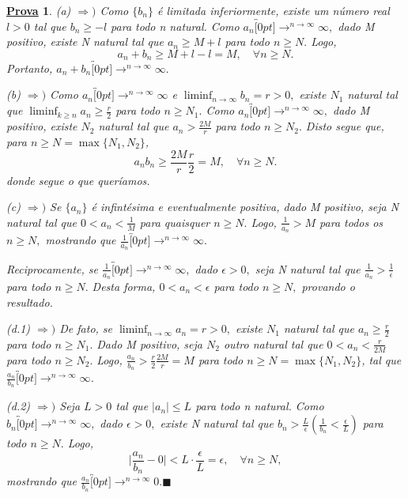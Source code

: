 \documentclass{article}
\newtheorem*{proof*}{\underline{Prova}}
\renewcommand\qedsymbol{$\blacksquare$}
\begin{document}
\begin{proof*}
  (a) $\Rightarrow)$ Como $\{b_{n}\}$ \'e limitada inferiormente, existe um n\'umero real $l > 0$ tal que $b_{n} \geq{ -l}$ para todo 
n natural. Como $a_{n}\overbracket[0pt]{\longrightarrow}^{n\to \infty}\infty,$ dado M positivo, existe N natural tal que 
 $a_{n}\geq{M}+l$ para todo $n\geq{N}.$ Logo, 
   $$
     a_{n} + b_{n}\geq{M+l-l} = M,\quad \forall n\geq{N}.
   $$
   Portanto, $a_{n} + b_{n}\overbracket[0pt]{\longrightarrow}^{n\to \infty}\infty.$

  (b) $\Rightarrow)$ Como $a_{n}\overbracket[0pt]{\longrightarrow}^{n\to \infty}\infty$ e $\liminf_{n\to\infty}b_{n} = r > 0,$
  existe $N_{1}$ natural tal que $\liminf_{k\geq{n}}a_{n} \geq{\frac{r}{2}}$ para todo $n\geq{N_{1}.}$ Como $a_{n}\overbracket[0pt]{\longrightarrow}^{n\to \infty}\infty,$
  dado M positivo, existe $N_{2}$ natural tal que $a_{n} > \frac{2M}{r}$ para todo $n\geq{N_{2}}.$ Disto segue que, para $n\geq{N = \max\{N_{1}, N_{2}\}}$, 
    $$
      a_{n}b_{n}\geq{\frac{2M}{r}\frac{r}{2}} = M,\quad \forall n\geq{N}.
    $$
  donde segue o que quer\'iamos.

  (c) $\Rightarrow)$ Se $\{a_{n}\}$ \'e infint\'esima e eventualmente positiva, dado M positivo, seja N natural tal que 
 $0 < a_{n} < \frac{1}{M}$ para quaisquer $n\geq{N}.$ Logo, $\frac{1}{a_{n}} > M$ para todos os $n\geq{N},$ mostrando que 
 $\frac{1}{a_{n}}\overbracket[0pt]{\longrightarrow}^{n\to \infty}\infty.$

 Reciprocamente, se $\frac{1}{a_{n}}\overbracket[0pt]{\longrightarrow}^{n\to \infty}\infty,$ dado $\epsilon > 0,$ seja N natural tal que
 $\frac{1}{a_{n}} > \frac{1}{\epsilon}$ para todo $n\geq{N}.$ Desta forma, $0 < a_{n} < \epsilon $ para todo $n\geq{N},$ provando o 
 resultado.

 (d.1) $\Rightarrow)$ De fato, se $\liminf_{n\to\infty}a_{n} = r > 0,$ existe $N_{1}$ natural tal que $a_{n}\geq{\frac{r}{2}}$ para todo $n\geq{N_{1}.}$
Dado M positivo, seja $N_{2}$ outro natural tal que $0 < a_{n} < \frac{r}{2M}$ para todo $n\geq{N_{2}}.$ Logo, $\frac{a_{n}}{b_{n}}>\frac{r}{2}\frac{2M}{r} = M$
para todo $n\geq{N} = \max\{N_{1}, N_{2}\}$, tal que $\frac{a_{n}}{b_{n}}\overbracket[0pt]{\longrightarrow}^{n\to \infty}\infty$.

  (d.2) $\Rightarrow)$ Seja $L > 0 $ tal que $|a_{n}|\leq{L}$ para todo n natural. Como $b_{n}\overbracket[0pt]{\longrightarrow}^{n\to \infty}\infty,$
  dado $\epsilon > 0,$ existe N natural tal que $b_{n} > \frac{L}{\epsilon}(\frac{1}{b_{n}} < \frac{\epsilon}{L})$ para todo $n\geq{N}.$ Logo,
  $$
    \biggl|\frac{a_{n}}{b_{n}} - 0\biggr| < L \cdot \frac{\epsilon}{L} = \epsilon,\quad \forall n\geq{N},
  $$
  mostrando que $\frac{a_{n}}{b_{n}}\overbracket[0pt]{\longrightarrow}^{n\to \infty}0.$\qedsymbol
\end{proof*}
\end{document}
